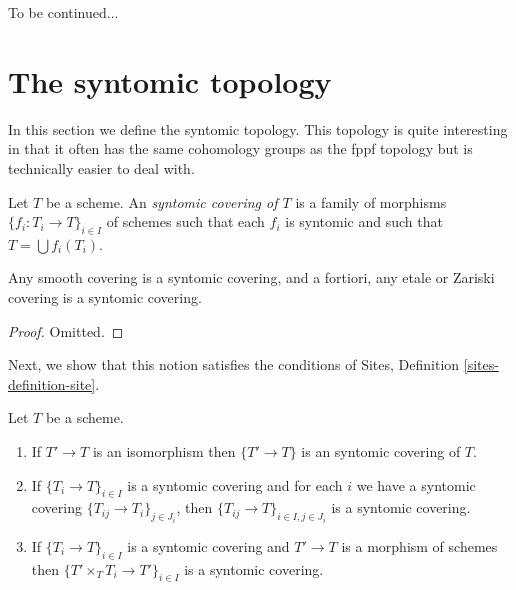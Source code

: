 \noindent
To be continued...

















\section{The syntomic topology}
\label{section-syntomic}

\noindent
In this section we define the syntomic topology.
This topology is quite interesting in that it often
has the same cohomology groups as the fppf topology
but is technically easier to deal with.

\begin{definition}
\label{definition-syntomic-covering}
Let $T$ be a scheme. An {\it syntomic covering of $T$} is a family
of morphisms $\{f_i : T_i \to T\}_{i \in I}$ of schemes
such that each $f_i$ is syntomic and such
that $T = \bigcup f_i(T_i)$.
\end{definition}

\begin{lemma}
\label{lemma-zariski-etale-smooth-syntomic}
Any smooth covering is a syntomic covering, and a fortiori,
any etale or Zariski covering is a syntomic covering.
\end{lemma}

\begin{proof}
Omitted.
\end{proof}

\noindent
Next, we show that this notion satisfies the conditions of
Sites, Definition \ref{sites-definition-site}.

\begin{lemma}
\label{lemma-syntomic}
Let $T$ be a scheme.
\begin{enumerate}
\item If $T' \to T$ is an isomorphism then $\{T' \to T\}$
is an syntomic covering of $T$.
\item If $\{T_i \to T\}_{i\in I}$ is a syntomic covering and for each
$i$ we have a syntomic covering $\{T_{ij} \to T_i\}_{j\in J_i}$, then
$\{T_{ij} \to T\}_{i \in I, j\in J_i}$ is a syntomic covering.
\item If $\{T_i \to T\}_{i\in I}$ is a syntomic covering
and $T' \to T$ is a morphism of schemes then
$\{T' \times_T T_i \to T'\}_{i\in I}$ is a syntomic covering.
\end{enumerate}
\end{lemma}

